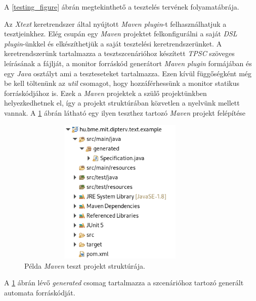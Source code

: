 A \ref{testing_figure} ábrán megtekinthető a tesztelés tervének folyamatábrája.

\clearpage

Az \textit{Xtext} keretrendszer által nyújtott \textit{Maven plugin}-t felhasználhatjuk a tesztjeinkhez.
Elég csupán egy \textit{Maven} projektet felkonfigurálni a saját \textit{DSL plugin}-ünkkel és elkészíthetjük a saját tesztelési keretrendszerünket.
A keretrendszerünk tartalmazza a tesztszcenárióhoz készített \textit{TPSC} szöveges leírásának a fájlját, a monitor forráskód generátort \textit{Maven plugin} formájában és egy \textit{Java} osztályt ami a teszteseteket tartalmazza.
Ezen kívül függőségként még be kell töltenünk az \textit{util} csomagot, hogy hozzáférhessünk a monitor statikus forráskódjához is.
Ezek a \textit{Maven} projektek a szülő projektünkben helyezkedhetnek el, így a projekt struktúrában közvetlen a nyelvünk mellett vannak.
A \ref{integration_test_structure} ábrán látható egy ilyen teszthez tartozó \textit{Maven} projekt felépítése

\begin{figure}[!ht]
    \centering
    \includegraphics[width=100mm, height=7cm, keepaspectratio]{figures/test_example_structure.png}
    \caption{Példa \textit{Maven} teszt projekt struktúrája.}
    \label{integration_test_structure}
\end{figure}

A \ref{integration_test_structure} ábrán lévő \textit{generated} csomag tartalmazza a szcenárióhoz tartozó generált automata forráskódját.

